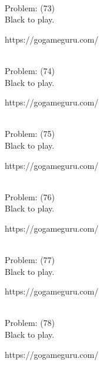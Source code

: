 \documentclass[11pt]{article}
\begin{document}
\begin{minipage}[t]{0.5\textwidth}
  {\centering
  
\\
  Problem: (73)\\
  Black to play.

https://gogameguru.com/\\
  }
\end{minipage}
\begin{minipage}[t]{0.5\textwidth}
  {\centering
  
\\
  Problem: (74)\\
  Black to play.

https://gogameguru.com/\\
  }
\end{minipage}
\begin{minipage}[t]{0.5\textwidth}
  {\centering
  
\\
  Problem: (75)\\
  Black to play.

https://gogameguru.com/\\
  }
\end{minipage}
\begin{minipage}[t]{0.5\textwidth}
  {\centering
  
\\
  Problem: (76)\\
  Black to play.

https://gogameguru.com/\\
  }
\end{minipage}
\begin{minipage}[t]{0.5\textwidth}
  {\centering
  
\\
  Problem: (77)\\
  Black to play.

https://gogameguru.com/\\
  }
\end{minipage}
\begin{minipage}[t]{0.5\textwidth}
  {\centering
  
\\
  Problem: (78)\\
  Black to play.

https://gogameguru.com/\\
  }
\end{minipage}
\end{document}
